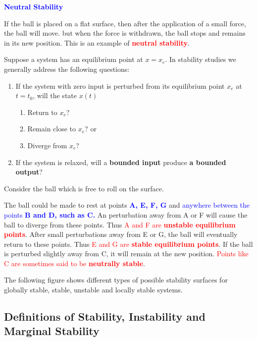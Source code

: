 \documentclass[
  14pt,
  a4paper,
  oneside,
  open=any,
  a4paper,
  14pt]{report}
\providecommand{\tightlist}{%
  \setlength{\itemsep}{0pt}\setlength{\parskip}{0pt}}\usepackage{longtable,booktabs,array}
\begin{document}
\textcolor{blue}{\textbf{Neutral Stability}}

If the ball is placed on a flat surface, then after the application of a
small force, the ball will move. but when the force is withdrawn, the
ball stops and remains in its new position. This is an example of
\textcolor{red}{\textbf{neutral stability}}.

Suppose a system has an equilibrium point at \(x = x_e\). In stability
studies we generally address the following questions:

\begin{enumerate}
\def\labelenumi{\arabic{enumi}.}
\tightlist
\item
  If the system with zero input is perturbed from its equilibrium point
  \(x_e\) at \(t = t_0\), will the state \(x(t)\)

  \begin{enumerate}
  \def\labelenumii{\alph{enumii}.}
  \tightlist
  \item
    Return to \(x_e\)?
  \item
    Remain close to \(x_e\)? or
  \item
    Diverge from \(x_e\)?
  \end{enumerate}
\item
  If the system is relaxed, will a \textbf{bounded input} produce
  \textbf{a bounded output}?
\end{enumerate}

Consider the ball which is free to roll on the surface.

The ball could be made to rest at points \textcolor{blue}{\textbf{A, E,
F, G}} and \textcolor{blue}{anywhere between the points \textbf{B and D,
such as C.}} An perturbation away from A or F will cause the ball to
diverge from these points. Thus \textcolor{red}{A and F are
\textbf{unstable equilibrium points}}. After small perturbations away
from E or G, the ball will eventually return to these points. Thus
\textcolor{red}{E and G are \textbf{stable equilibrium points}}. If the
ball is perturbed slightly away from C, it will remain at the new
position. \textcolor{red}{Points like C are sometimes said to be
\textbf{neutrally stable}}.

The following figure shows different types of possible stability
surfaces for globally stable, stable, unstable and locally stable
systems.

\subsection{Definitions of Stability, Instability and Marginal
Stability}\label{definitions-of-stability-instability-and-marginal-stability}
\end{document}
